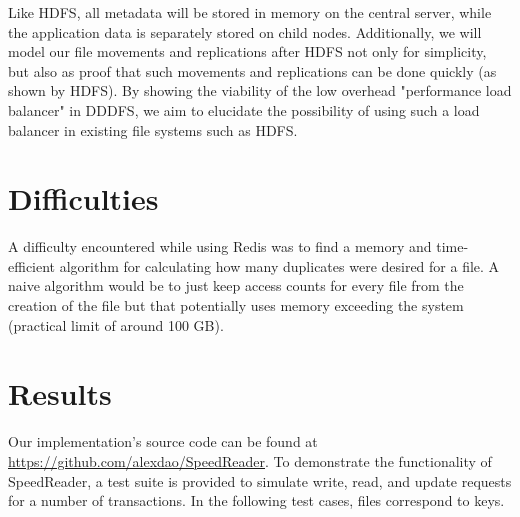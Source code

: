 \documentclass[twoside]{article}
\begin{document}
\begin{multicols}{2}
Like HDFS, all metadata will be stored in memory on the central server, while the application data is separately stored on child nodes. Additionally, we will model our file movements and replications after HDFS not only for simplicity, but also as proof that such movements and replications can be done quickly (as shown by HDFS). By showing the viability of the low overhead "performance load balancer" in DDDFS, we aim to elucidate the possibility of using such a load balancer in existing file systems such as HDFS.
\section{Difficulties}
A difficulty encountered while using Redis was to find a memory and time-efficient algorithm for calculating how many duplicates were desired for a file. A naive algorithm would be to just keep access counts for every file from the creation of the file but that potentially uses memory exceeding the system (practical limit of around 100 GB).


\section{Results}
Our implementation's source code can be found at \href{https://github.com/alexdao/SpeedReader}{https://github.com/alexdao/SpeedReader}. To demonstrate the functionality of SpeedReader, a test suite is provided to simulate write, read, and update requests for a number of transactions. In the following test cases, files correspond to keys. \\\indent

\end{multicols}
\end{document}

